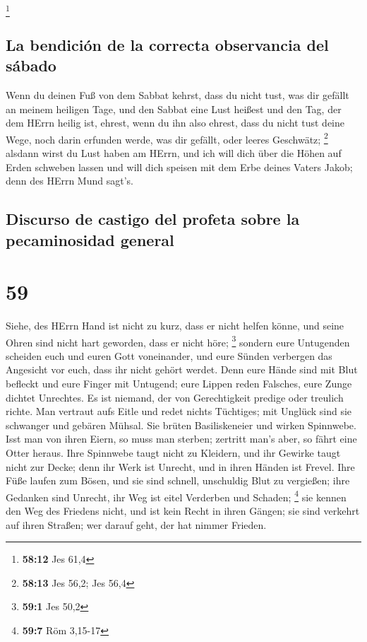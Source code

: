 \footnote{\textbf{58:12} Jes 61,4}

\hypertarget{la-bendiciuxf3n-de-la-correcta-observancia-del-suxe1bado}{%
\subsection{La bendición de la correcta observancia del
sábado}\label{la-bendiciuxf3n-de-la-correcta-observancia-del-suxe1bado}}

 Wenn du deinen Fuß von dem Sabbat kehrst, dass du nicht
tust, was dir gefällt an meinem heiligen Tage, und den Sabbat eine Lust
heißest und den Tag, der dem HErrn heilig ist, ehrest, wenn du ihn also
ehrest, dass du nicht tust deine Wege, noch darin erfunden werde, was
dir gefällt, oder leeres Geschwätz; \footnote{\textbf{58:13} Jes 56,2;
  Jes 56,4}  alsdann wirst du Lust haben am HErrn, und
ich will dich über die Höhen auf Erden schweben lassen und will dich
speisen mit dem Erbe deines Vaters Jakob; denn des HErrn Mund sagt's.

\hypertarget{discurso-de-castigo-del-profeta-sobre-la-pecaminosidad-general}{%
\subsection{Discurso de castigo del profeta sobre la pecaminosidad
general}\label{discurso-de-castigo-del-profeta-sobre-la-pecaminosidad-general}}

\hypertarget{section-58}{%
\section{59}\label{section-58}}

 Siehe, des HErrn Hand ist nicht zu kurz, dass er nicht
helfen könne, und seine Ohren sind nicht hart geworden, dass er nicht
höre; \footnote{\textbf{59:1} Jes 50,2}  sondern eure
Untugenden scheiden euch und euren Gott voneinander, und eure Sünden
verbergen das Angesicht vor euch, dass ihr nicht gehört werdet.
 Denn eure Hände sind mit Blut befleckt und eure Finger
mit Untugend; eure Lippen reden Falsches, eure Zunge dichtet Unrechtes.
 Es ist niemand, der von Gerechtigkeit predige oder
treulich richte. Man vertraut aufs Eitle und redet nichts Tüchtiges; mit
Unglück sind sie schwanger und gebären Mühsal.  Sie brüten
Basiliskeneier und wirken Spinnwebe. Isst man von ihren Eiern, so muss
man sterben; zertritt man's aber, so fährt eine Otter heraus.
 Ihre Spinnwebe taugt nicht zu Kleidern, und ihr Gewirke
taugt nicht zur Decke; denn ihr Werk ist Unrecht, und in ihren Händen
ist Frevel.  Ihre Füße laufen zum Bösen, und sie sind
schnell, unschuldig Blut zu vergießen; ihre Gedanken sind Unrecht, ihr
Weg ist eitel Verderben und Schaden; \footnote{\textbf{59:7} Röm 3,15-17}
 sie kennen den Weg des Friedens nicht, und ist kein Recht
in ihren Gängen; sie sind verkehrt auf ihren Straßen; wer darauf geht,
der hat nimmer Frieden.

